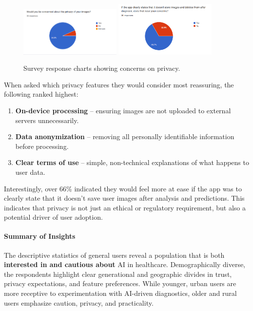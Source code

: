 \documentclass[
  12pt,
  oneside]{article}
\providecommand{\tightlist}{%
  \setlength{\itemsep}{0pt}\setlength{\parskip}{0pt}}
\begin{document}
\begin{figure}[h!]
    \centering
    \includegraphics[width=0.45\textwidth]{privacy-chart1.png}
    \hfill
    \includegraphics[width=0.45\textwidth]{privacy-chart2.png}
    \caption{Survey response charts showing concerns on privacy.}
\end{figure}

When asked which privacy features they would consider most reassuring,
the following ranked highest:

\begin{enumerate}
\def\labelenumi{\arabic{enumi}.}
\tightlist
\item
  \textbf{On-device processing} -- ensuring images are not uploaded to
  external servers unnecessarily.\\
\item
  \textbf{Data anonymization} -- removing all personally identifiable
  information before processing.\\
\item
  \textbf{Clear terms of use} -- simple, non-technical explanations of
  what happens to user data.
\end{enumerate}

Interestingly, over 66\% indicated they would feel more at ease if the
app was to clearly state that it doesn't save user images after analysis
and predictions. This indicates that privacy is not just an ethical or
regulatory requirement, but also a potential driver of user adoption.

\paragraph{Summary of Insights}\label{summary-of-insights}

The descriptive statistics of general users reveal a population that is
both \textbf{interested in and cautious about} AI in healthcare.
Demographically diverse, the respondents highlight clear generational
and geographic divides in trust, privacy expectations, and feature
preferences. While younger, urban users are more receptive to
experimentation with AI-driven diagnostics, older and rural users
emphasize caution, privacy, and practicality.
\end{document}
